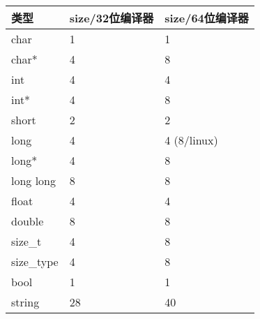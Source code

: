 \documentclass[letterpaper,10pt,english]{sphinxmanual}
\begin{document}
\begin{savenotes}\sphinxattablestart
\centering
\begin{tabulary}{\linewidth}[t]{|T|T|T|}
\hline
\sphinxstyletheadfamily 
类型
&\sphinxstyletheadfamily 
size/32位编译器
&\sphinxstyletheadfamily 
size/64位编译器
\\
\hline
char
&
1
&
1
\\
\hline
char*
&
4
&
8
\\
\hline
int
&
4
&
4
\\
\hline
int*
&
4
&
8
\\
\hline
short
&
2
&
2
\\
\hline
long
&
4
&
4 (8/linux)
\\
\hline
long*
&
4
&
8
\\
\hline
long long
&
8
&
8
\\
\hline
float
&
4
&
4
\\
\hline
double
&
8
&
8
\\
\hline
size\_t
&
4
&
8
\\
\hline
size\_type
&
4
&
8
\\
\hline
bool
&
1
&
1
\\
\hline
string
&
28
&
40
\\
\hline
\end{tabulary}
\par
\sphinxattableend\end{savenotes}
\end{document}
